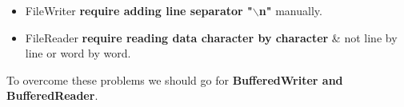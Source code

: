 \setlength{\columnsep}{3pt}
\begin{flushleft}

	

	\begin{itemize}
		\item FileWriter \textbf{require adding line separator "$\backslash$n"} manually.
		\item FileReader \textbf{require reading data character by character} \& not line by line or word by word.
	\end{itemize}	


	To overcome these problems we should go for \textbf{BufferedWriter and BufferedReader}.
	
\end{flushleft}


